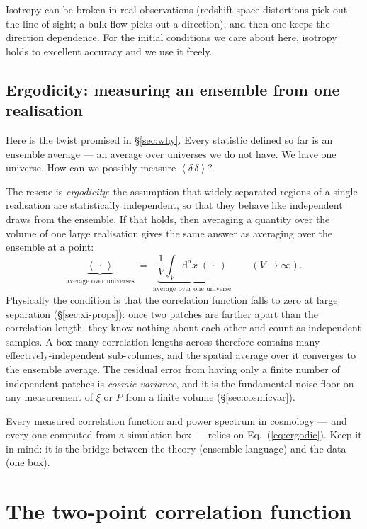 \documentclass[12pt]{article}
\newcommand{\avg}[1]{\left\langle #1 \right\rangle}
\begin{document}
Isotropy can be broken in real observations (redshift-space distortions
pick out the line of sight; a bulk flow picks out a direction), and then
one keeps the direction dependence.  For the initial conditions we care
about here, isotropy holds to excellent accuracy and we use it freely.

\subsection{Ergodicity: measuring an ensemble from one realisation}
\label{sec:ergodic}

Here is the twist promised in \S\ref{sec:why}.  Every statistic defined
so far is an ensemble average --- an average over universes we do not
have.  We have one universe.  How can we possibly measure
$\avg{\delta\,\delta}$?

The rescue is \emph{ergodicity}: the assumption that widely separated
regions of a single realisation are statistically independent, so that
they behave like independent draws from the ensemble.  If that holds,
then averaging a quantity over the volume of one large realisation gives
the same answer as averaging over the ensemble at a point:
\begin{equation}
  \underbrace{\avg{\,\cdot\,}}_{\text{average over universes}}
  \;=\;
  \underbrace{\frac{1}{V}\int_V \mathrm d^d x\;(\,\cdot\,)}_{\text{average over one universe}}
  \qquad (V \to \infty).
  \label{eq:ergodic}
\end{equation}
Physically the condition is that the correlation function falls to zero
at large separation (\S\ref{sec:xi-props}): once two patches are farther
apart than the correlation length, they know nothing about each other
and count as independent samples.  A box many correlation lengths across
therefore contains many effectively-independent sub-volumes, and the
spatial average over it converges to the ensemble average.  The residual
error from having only a finite number of independent patches is
\emph{cosmic variance}, and it is the fundamental noise floor on any
measurement of $\xi$ or $P$ from a finite volume (\S\ref{sec:cosmicvar}).

Every measured correlation function and power spectrum in cosmology ---
and every one computed from a simulation box --- relies on
Eq.~(\ref{eq:ergodic}).  Keep it in mind: it is the bridge between the
theory (ensemble language) and the data (one box).

\section{The two-point correlation function}
\label{sec:xi}
\end{document}
